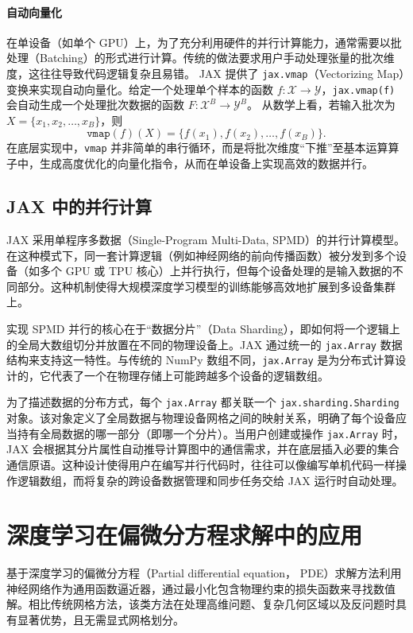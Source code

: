 \paragraph{自动向量化}
在单设备（如单个 GPU）上，为了充分利用硬件的并行计算能力，通常需要以批处理（Batching）的形式进行计算。传统的做法要求用户手动处理张量的批次维度，这往往导致代码逻辑复杂且易错。
JAX 提供了 \texttt{jax.vmap}（Vectorizing Map）变换来实现自动向量化。给定一个处理单个样本的函数 $f: \mathcal{X} \to \mathcal{Y}$，\texttt{jax.vmap(f)} 会自动生成一个处理批次数据的函数 $F: \mathcal{X}^B \to \mathcal{Y}^B$。
从数学上看，若输入批次为 $X = \{x_1, x_2, \dots, x_B\}$，则
\begin{equation}
    \texttt{vmap}(f)(X) = \{f(x_1), f(x_2), \dots, f(x_B)\}.
\end{equation}
在底层实现中，\texttt{vmap} 并非简单的串行循环，而是将批次维度“下推”至基本运算算子中，生成高度优化的向量化指令，从而在单设备上实现高效的数据并行。

\subsection{JAX 中的并行计算}
JAX 采用单程序多数据（Single-Program Multi-Data, SPMD）的并行计算模型。在这种模式下，同一套计算逻辑（例如神经网络的前向传播函数）被分发到多个设备（如多个 GPU 或 TPU 核心）上并行执行，但每个设备处理的是输入数据的不同部分。这种机制使得大规模深度学习模型的训练能够高效地扩展到多设备集群上。

实现 SPMD 并行的核心在于“数据分片”（Data Sharding），即如何将一个逻辑上的全局大数组切分并放置在不同的物理设备上。JAX 通过统一的 \texttt{jax.Array} 数据结构来支持这一特性。与传统的 NumPy 数组不同，\texttt{jax.Array} 是为分布式计算设计的，它代表了一个在物理存储上可能跨越多个设备的逻辑数组。

为了描述数据的分布方式，每个 \texttt{jax.Array} 都关联一个 \texttt{jax.sharding.Sharding} 对象。该对象定义了全局数据与物理设备网格之间的映射关系，明确了每个设备应当持有全局数据的哪一部分（即哪一个分片）。当用户创建或操作 \texttt{jax.Array} 时，JAX 会根据其分片属性自动推导计算图中的通信需求，并在底层插入必要的集合通信原语。这种设计使得用户在编写并行代码时，往往可以像编写单机代码一样操作逻辑数组，而将复杂的跨设备数据管理和同步任务交给 JAX 运行时自动处理。

\section{深度学习在偏微分方程求解中的应用}

基于深度学习的偏微分方程（Partial differential equation， PDE）求解方法利用神经网络作为通用函数逼近器，通过最小化包含物理约束的损失函数来寻找数值解。相比传统网格方法，该类方法在处理高维问题、复杂几何区域以及反问题时具有显著优势，且无需显式网格划分。


